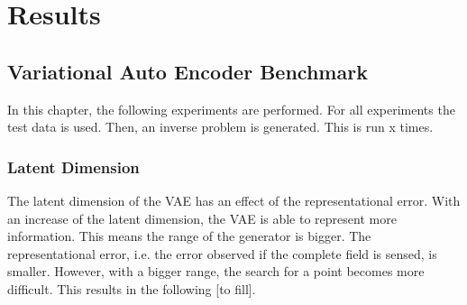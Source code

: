 
\chapter{Results}\label{chapter:results}
\section{Variational Auto Encoder Benchmark}
In this chapter, the following experiments are performed.
For all experiments the test data is used.
Then, an inverse problem is generated.
This is run x times.

\subsection{Latent Dimension}
The latent dimension of the VAE has an effect of the representational error.
With an increase of the latent dimension, the VAE is able to represent more information.
This means the range of the generator is bigger.
The representational error, i.e. the error observed if the complete field is sensed, is smaller.
However, with a bigger range, the search for a point becomes more difficult.
This results in the following [to fill].
